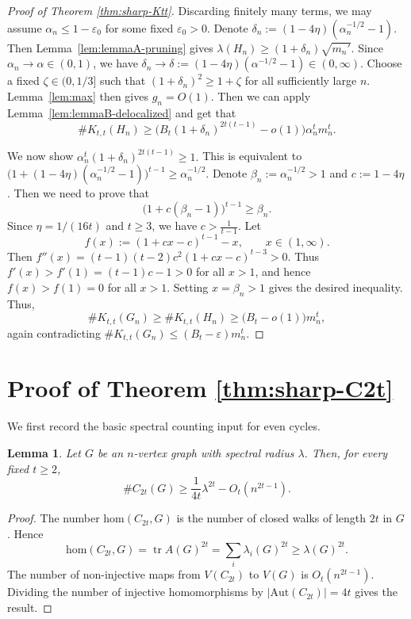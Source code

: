 \documentclass[11pt]{article}
\newtheorem{lemma}[theorem]{Lemma}
\theoremstyle{definition}
\theoremstyle{plain}
\newcommand{\Ktt}{K_{t,t}}
\newcommand{\homc}{\mathrm{hom}}
\newcommand{\Aut}{\mathrm{Aut}}
\begin{document}
\begin{proof}[Proof of Theorem \ref{thm:sharp-Ktt}]
\smallskip

Discarding finitely many terms, we may assume $\alpha_n\le 1-\varepsilon_0$ for some fixed $\varepsilon_0>0$.
Denote $\delta_n:=(1-4\eta)(\alpha_n^{-1/2}-1).$
Then Lemma~\ref{lem:lemmaA-pruning} gives
$\lambda(H_n)\ge (1+\delta_n)\sqrt{m_n'}.$
Since $\alpha_n\to\alpha\in(0,1)$, we have $\delta_n\to\delta :=(1-4\eta)(\alpha^{-1/2} -1)\in(0,\infty).$
Choose a fixed \(\zeta\in(0,1/3]\) such that $(1+\delta_n)^2\ge 1+\zeta$
for all sufficiently large \(n\). Lemma~\ref{lem:max} then gives \(g_n=O(1)\).
Then we can apply Lemma~\ref{lem:lemmaB-delocalized} and get that 
\[
 \texttt{\#}\Ktt(H_n)
 \ge
 \bigl(B_t(1+\delta_n)^{2t(t-1)}-o(1)\bigr)\alpha_n^t m_n^t.
\] 

We now show $\alpha_n^t(1+\delta_n)^{2t(t-1)}\ge 1.$
This is equivalent to $\big(1+(1-4\eta)(\alpha_n^{-1/2} -1)\big)^{t-1} \ge \alpha_n^{-1/2}.$
Denote $\beta_n:=\alpha_n^{-1/2}> 1$ and $c:=1-4\eta$. 
Then we need to prove that 
\[
        \big(1+c(\beta_n-1) \big)^{t-1} \ge \beta_n.
\]
Since \(\eta=1/(16t)\) and $t\ge 3$, we have $c> \frac{1}{t-1}.$
Let
\[
        f(x):=(1+cx-c )^{t-1}-x,
        \qquad x\in (1,\infty).
\]
Then        $f''(x) =(t-1)(t-2)c^2(1+cx-c)^{t-3} > 0.$
Thus
$f'(x)> f'(1)=(t-1)c-1>0$
for all \(x>1\), and hence
$f(x)>f(1)=0$
for all \(x>1\). Setting \(x=\beta_n>1\) gives the desired inequality.
Thus,
\[
     \texttt{\#}\Ktt(G_n)
        \ge
        \texttt{\#}K_{t,t}(H_n)
        \ge
        \bigl(B_t-o(1)\bigr)m_n^t,
\]
again contradicting \(\texttt{\#}\Ktt(G_n)\le (B_t-\varepsilon)m_n^t\).
\end{proof}



\section{Proof of Theorem \ref{thm:sharp-C2t}}

\label{sec:even-cycles}

We first record the basic spectral counting input for even cycles.

\begin{lemma}
\label{lem:spectral-count-C2t}
Let \(G\) be an \(n\)-vertex graph with spectral radius \(\lambda\).
Then, for every fixed \(t\ge2\),
\[
        \texttt{\#}C_{2t}(G)
        \ge
        \frac{1}{4t}\lambda^{2t}-O_t(n^{2t-1}).
\]
\end{lemma}

\begin{proof}
The number \(\homc(C_{2t},G)\) is the number of closed walks of length
\(2t\) in \(G\).  Hence
\[
        \homc(C_{2t},G)
        =
        \operatorname{tr}A(G)^{2t}
        =
        \sum_i \lambda_i(G)^{2t}
        \ge
        \lambda(G)^{2t}.
\]
The number of non-injective maps from \(V(C_{2t})\) to \(V(G)\) is
\(O_t(n^{2t-1})\).  Dividing the number of injective homomorphisms by
\(|\Aut(C_{2t})|=4t\) gives the result.
\end{proof}
\end{document}
